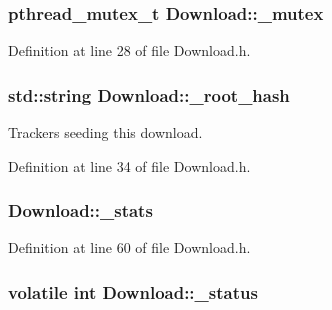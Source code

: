 \hypertarget{classDownload_ab73d857fa4f5082ea72a91d1df0c769f}{
\subsubsection[{\_\-mutex}]{\setlength{\rightskip}{0pt plus 5cm}pthread\_\-mutex\_\-t {\bf Download::\_\-mutex}}}
\label{classDownload_ab73d857fa4f5082ea72a91d1df0c769f}


Definition at line 28 of file Download.h.

\hypertarget{classDownload_a3e7db6fe59ed31d8e69b365e117a9847}{
\subsubsection[{\_\-root\_\-hash}]{\setlength{\rightskip}{0pt plus 5cm}std::string {\bf Download::\_\-root\_\-hash}}}
\label{classDownload_a3e7db6fe59ed31d8e69b365e117a9847}


Trackers seeding this download. 



Definition at line 34 of file Download.h.

\hypertarget{classDownload_a7bf716e1095fd5dcd0157b8d846debc0}{
\subsubsection[{\_\-stats}]{ {\bf Download::\_\-stats}}}
\label{classDownload_a7bf716e1095fd5dcd0157b8d846debc0}


Definition at line 60 of file Download.h.

\hypertarget{classDownload_a562511e0630169011935c79ba0367872}{
\subsubsection[{\_\-status}]{\setlength{\rightskip}{0pt plus 5cm}volatile int {\bf Download::\_\-status}}}
\label{classDownload_a562511e0630169011935c79ba0367872}


